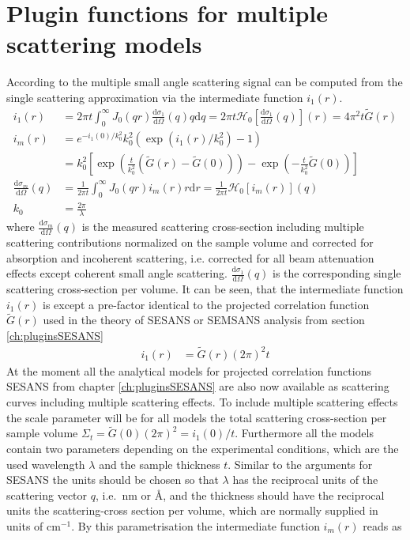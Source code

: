 \clearpage
\section{Plugin functions for multiple scattering models}
\label{ch:pluginsMSANS}

According to \cite{Schelten1980,Jensen2018} the multiple  small angle scattering signal can be computed from the single scattering approximation via the intermediate function $i_1(r)$.
\begin{align}\label{eq:MSAS_SchmatzSchelten}
 i_1(r) &= 2\pi t \int_0^\infty J_0(qr) \frac{\mathrm{d}\sigma_1}{\mathrm{d}\Omega}(q) q \mathrm{d}q =2\pi t \mathcal{H}_0\left[\frac{\mathrm{d}\sigma_1}{\mathrm{d}\Omega}(q)\right](r)= 4\pi^2 t \tilde{G}(r)\\
 i_m(r) &= e^{-i_1(0)/k_0^2}k_0^2\left(\exp\left(i_1(r)/k_0^2\right)-1\right) \\
        &= k_0^2\left[\exp\left(\frac{t}{k_0^2}\left(\tilde{G}(r)-\tilde{G}(0)\right)\right)-\exp\left(-\frac{t}{k_0^2}\tilde{G}(0)\right)\right]\\
 \frac{\mathrm{d}\sigma_m}{\mathrm{d}\Omega}(q)&= \frac{1}{2\pi t} \int_0^\infty J_0(qr) i_m(r) r \mathrm{d}r = \frac{1}{2\pi t} \mathcal{H}_0\left[i_m(r)\right](q) \\
 k_0 &= \frac{2\pi}{\lambda}
\end{align}
where $\frac{\mathrm{d}\sigma_m}{\mathrm{d}\Omega}(q)$ is the measured scattering cross-section including multiple scattering contributions normalized on the sample volume and  corrected for absorption and incoherent scattering, i.e. corrected for all beam attenuation effects except coherent small angle scattering. $\frac{\mathrm{d}\sigma_1}{\mathrm{d}\Omega}(q)$ is the corresponding single scattering cross-section per volume.
It can be seen, that the intermediate function $i_1(r)$ is except a pre-factor identical to the projected correlation function $\tilde{G}(r)$ used in the theory of  SESANS or SEMSANS analysis from section \ref{ch:pluginsSESANS}
\begin{align}
i_1(r)&=\tilde{G}(r)\left(2\pi\right)^2t
\end{align}
At the moment all the analytical models for projected correlation functions SESANS from chapter \ref{ch:pluginsSESANS} are also now available as scattering curves including multiple scattering effects. To include multiple scattering effects the scale parameter will be for all models the total scattering cross-section per sample volume $\Sigma_t=\tilde{G}(0)(2\pi)^2=i_1(0)/t$. Furthermore all the models contain two parameters  depending on the experimental conditions, which are the used wavelength $\lambda$ and the sample thickness $t$. Similar to the arguments for SESANS \cite{Kohlbrecher2017} the units should be chosen so that  $\lambda$ has the reciprocal units of the scattering vector $q$, i.e.\ nm or {\AA}, and the thickness should have the reciprocal units the scattering-cross section per volume, which are normally supplied in units of cm$^{-1}$. By this parametrisation the intermediate function $i_m(r)$ reads as
